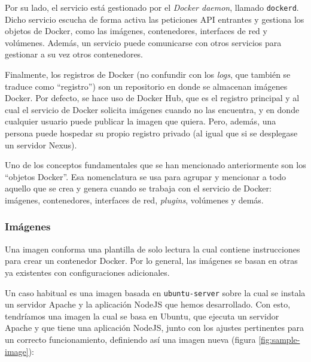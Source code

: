 Por su lado, el servicio está gestionado por el \textit{Docker daemon}, llamado
\texttt{dockerd}. Dicho servicio escucha de forma activa las peticiones API entrantes
y gestiona los objetos de Docker, como las imágenes, contenedores, interfaces de red
y volúmenes. Además, un servicio puede comunicarse con otros servicios para gestionar
a su vez otros contenedores.

Finalmente, los registros de Docker (no confundir con los \textit{logs}, que también
se traduce como ``registro'') son un repositorio en donde se almacenan imágenes Docker.
Por defecto, se hace uso de Docker Hub, que es el registro principal y al cual
el servicio de Docker solicita imágenes cuando no las encuentra, y en donde cualquier
usuario puede publicar la imagen que quiera. Pero, además, una persona puede hospedar
su propio registro privado (al igual que si se desplegase un servidor Nexus).

Uno de los conceptos fundamentales que se han mencionado anteriormente son los ``objetos
Docker''. Esa nomenclatura se usa para agrupar y mencionar a todo aquello que se crea
y genera cuando se trabaja con el servicio de Docker: imágenes, contenedores, interfaces de red,
\textit{plugins}, volúmenes y demás.

\subsubsection*{Imágenes}
Una imagen conforma una plantilla de solo lectura la cual contiene instrucciones
para crear un contenedor Docker. Por lo general, las imágenes se basan en otras
ya existentes con configuraciones adicionales.

Un caso habitual es una imagen basada en \texttt{ubuntu-server} sobre la cual
se instala un servidor Apache y la aplicación NodeJS que hemos desarrollado. Con esto,
tendríamos una imagen la cual se basa en Ubuntu, que ejecuta un servidor Apache y
que tiene una aplicación NodeJS, junto con los ajustes pertinentes para un
correcto funcionamiento, definiendo así una imagen nueva (figura \ref{fig:sample-image}):

